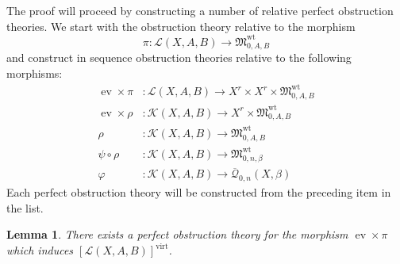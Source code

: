 \documentclass[11pt]{amsart}
\newcommand{\Q}[4]{\overline{\mathcal Q}_{#1,#2}(#3,#4)}
\renewcommand{\to}{\rightarrow}
\newcommand{\MM}{\mathfrak M}
\newcommand{\virt}[1]{[#1]^{\operatorname{virt}}}
\newcommand{\ev}{\operatorname{ev}}
\theoremstyle{plain}
\newtheorem{lemma}[thm]{Lemma}
\theoremstyle{definition}
\begin{document}
The proof will proceed by constructing a number of relative perfect obstruction theories. We start with the obstruction theory relative to the morphism
\begin{equation*} \pi : \mathcal{L}(X,A,B) \to \MM_{0,A,B}^{\operatorname{wt}} \end{equation*}
and construct in sequence obstruction theories relative to the following morphisms:
\begin{align*}
\ev \times \pi & : \mathcal{L}(X,A,B) \to X^r \times X^r \times \MM_{0,A,B}^{\operatorname{wt}}\\
\ev \times \rho & : \mathcal{K}(X,A,B) \to X^r \times \MM_{0,A,B}^{\operatorname{wt}} \\
\rho & : \mathcal{K}(X,A,B) \to \MM_{0,A,B}^{\operatorname{wt}}\\
\psi \circ \rho & : \mathcal{K}(X,A,B) \to \MM_{0,n,\beta}^{\operatorname{wt}} \\
\varphi & : \mathcal{K}(X,A,B) \to \Q{0}{n}{X}{\beta}
\end{align*}
Each perfect obstruction theory will be constructed from the preceding item in the list.

\begin{lemma} There exists a perfect obstruction theory for the morphism $\ev \times \pi$ which induces $\virt{\mathcal{L}(X,A,B)}$. \end{lemma}
\end{document}
